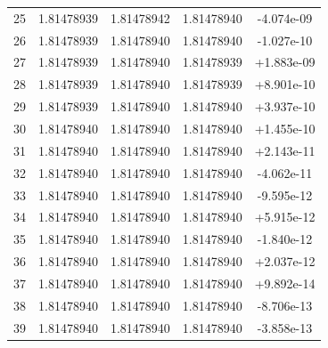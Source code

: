 \begin{tabular}{rcccc}
25 & 1.81478939 & 1.81478942 & 1.81478940 & -4.074e-09 \\
26 & 1.81478939 & 1.81478940 & 1.81478940 & -1.027e-10 \\
27 & 1.81478939 & 1.81478940 & 1.81478939 & +1.883e-09 \\
28 & 1.81478939 & 1.81478940 & 1.81478939 & +8.901e-10 \\
29 & 1.81478939 & 1.81478940 & 1.81478940 & +3.937e-10 \\
30 & 1.81478940 & 1.81478940 & 1.81478940 & +1.455e-10 \\
31 & 1.81478940 & 1.81478940 & 1.81478940 & +2.143e-11 \\
32 & 1.81478940 & 1.81478940 & 1.81478940 & -4.062e-11 \\
33 & 1.81478940 & 1.81478940 & 1.81478940 & -9.595e-12 \\
34 & 1.81478940 & 1.81478940 & 1.81478940 & +5.915e-12 \\
35 & 1.81478940 & 1.81478940 & 1.81478940 & -1.840e-12 \\
36 & 1.81478940 & 1.81478940 & 1.81478940 & +2.037e-12 \\
37 & 1.81478940 & 1.81478940 & 1.81478940 & +9.892e-14 \\
38 & 1.81478940 & 1.81478940 & 1.81478940 & -8.706e-13 \\
39 & 1.81478940 & 1.81478940 & 1.81478940 & -3.858e-13 \\
\bottomrule
\end{tabular}